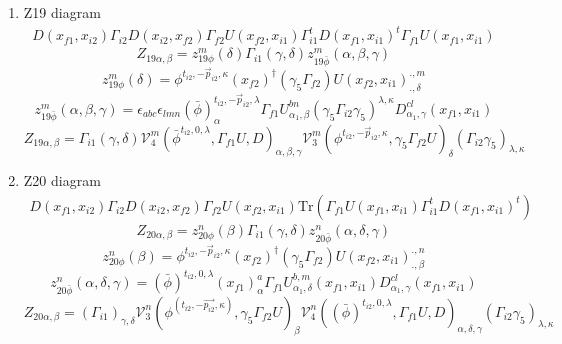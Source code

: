 \documentclass{article}[12pt]
\begin{document}
\begin{itemize}
\begin{enumerate}
$$$$
$$
Z_{18\alpha,\beta}=\left(\Gamma_{i1}\right)_{\gamma,\delta}{\mathcal V}_{3}^{n}\left(\phi^{\left(t_{i2},-\vec{p_{i2}},\kappa\right)},\gamma_5\Gamma_{f2}U\right)_{\beta}{\mathcal V}_{2}^{n}\left(\left(\bar{\phi}\right)^{t_{i2},0,\lambda},\Gamma_{f1}U,D\right)_{\delta,\alpha,\gamma}\left(\Gamma_{i2}\gamma_5\right)_{\lambda,\kappa}
$$
\item Z19 diagram
\begin{eqnarray}
D(x_{f1},x_{i2})\Gamma_{i2}D(x_{i2},x_{f2})\Gamma_{f2}U(x_{f2},x_{i1})\Gamma_{i1}^tD(x_{f1},x_{i1})^t\Gamma_{f1}U(x_{f1},x_{i1})
\end{eqnarray}
$$
Z_{19\alpha,\beta}=z_{19\phi}^{m}\left(\delta\right)\Gamma_{i1}\left(\gamma,\delta\right)z_{19\bar{\phi}}^{m}\left(\alpha,\beta,\gamma\right)
$$
$$
z_{19\phi}^{m}\left(\delta\right)=
\phi^{t_{i2},-\vec{p}_{i2},\kappa}\left(x_{f2}\right)^{\dagger}\left(\gamma_5\Gamma_{f2}\right)U\left(x_{f2},x_{i1}\right)^{.,m}_{.,\delta}
$$
$$
z_{19\bar{\phi}}^{m}\left(\alpha,\beta,\gamma\right)=\epsilon_{abc}\epsilon_{lmn}\left(\bar{\phi}\right)^{t_{i2},-\vec{p}_{i2},\lambda}_{\alpha}\Gamma_{f1}U^{bn}_{\alpha_1,\beta}\left(\gamma_5\Gamma_{i2}\gamma_5\right)^{\lambda,\kappa}D^{cl}_{\alpha_1,\gamma}\left(x_{f1},x_{i1}\right)
$$
$$
Z_{19\alpha,\beta}=\Gamma_{i1}\left(\gamma,\delta\right){\mathcal V}^{m}_{4}\left(\bar{\phi}^{t_{i2},0,\lambda},\Gamma_{f1}U,D\right)_{\alpha,\beta,\gamma}{\mathcal V}^{m}_{3}\left(\phi^{t_{i2},-\vec{p}_{i2},\kappa},\gamma_5\Gamma_{f2}U\right)_{\delta}\left(\Gamma_{i2}\gamma_5\right)_{\lambda,\kappa}
$$
\item Z20 diagram
\begin{eqnarray}
D(x_{f1},x_{i2})\Gamma_{i2}D(x_{i2},x_{f2})\Gamma_{f2}U(x_{f2},x_{i1})\mathrm{Tr}\left(\Gamma_{f1}U(x_{f1},x_{i1})\Gamma_{i1}^tD(x_{f1},x_{i1})^t\right)
\end{eqnarray}
$$
Z_{20\alpha,\beta}=z_{20\phi}^{n}\left(\beta\right)\Gamma_{i1}\left(\gamma,\delta\right)z_{20\bar{\phi}}^{n}\left(\alpha,\delta,\gamma\right)
$$
$$
z_{20\phi}^{n}\left(\beta\right)=\phi^{t_{i2},-\vec{p}_{i2},\kappa}\left(x_{f2}\right)^{\dagger}\left(\gamma_5\Gamma_{f2}\right)U\left(x_{f2},x_{i1}\right)^{.,n}_{.,\beta}
$$
$$
z_{20\bar{\phi}}^{n}\left(\alpha,\delta,\gamma\right)=\left(\bar{\phi}\right)^{t_{i2},0,\lambda}\left(x_{f1}\right)^{a}_{\alpha}\Gamma_{f1}U_{\alpha_1,\delta}^{b,m}\left(x_{f1},x_{i1}\right)D^{cl}_{\alpha_1,\gamma}\left(x_{f1},x_{i1}\right)
$$
$$
Z_{20\alpha,\beta}=\left(\Gamma_{i1}\right)_{\gamma,\delta}{\mathcal V}_{3}^{n}\left(\phi^{\left(t_{i2},-\vec{p_{i2}},\kappa\right)},\gamma_5\Gamma_{f2}U\right)_{\beta}{\mathcal V}_{4}^{n}\left(\left(\bar{\phi}\right)^{t_{i2},0,\lambda},\Gamma_{f1}U,D\right)_{\alpha,\delta,\gamma}\left(\Gamma_{i2}\gamma_5\right)_{\lambda,\kappa}
$$
\end{enumerate}
\end{itemize}
\end{document}
